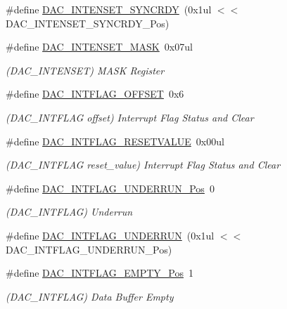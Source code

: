 \begin{DoxyCompactItemize}
\#define \mbox{\hyperlink{group___s_a_m_d21___d_a_c_ga160f399b31890e2fb6af4a43bd547952}{D\+A\+C\+\_\+\+I\+N\+T\+E\+N\+S\+E\+T\+\_\+\+S\+Y\+N\+C\+R\+DY}}~(0x1ul $<$$<$ D\+A\+C\+\_\+\+I\+N\+T\+E\+N\+S\+E\+T\+\_\+\+S\+Y\+N\+C\+R\+D\+Y\+\_\+\+Pos)
\item 
\#define \mbox{\hyperlink{group___s_a_m_d21___d_a_c_ga16937f1a74d06e17331ee7d86534570a}{D\+A\+C\+\_\+\+I\+N\+T\+E\+N\+S\+E\+T\+\_\+\+M\+A\+SK}}~0x07ul
\begin{DoxyCompactList}\small\item\em (D\+A\+C\+\_\+\+I\+N\+T\+E\+N\+S\+ET) M\+A\+SK Register \end{DoxyCompactList}\item 
\#define \mbox{\hyperlink{group___s_a_m_d21___d_a_c_gadb76074cbcb6b6dbbe088030f72d5a4b}{D\+A\+C\+\_\+\+I\+N\+T\+F\+L\+A\+G\+\_\+\+O\+F\+F\+S\+ET}}~0x6
\begin{DoxyCompactList}\small\item\em (D\+A\+C\+\_\+\+I\+N\+T\+F\+L\+AG offset) Interrupt Flag Status and Clear \end{DoxyCompactList}\item 
\#define \mbox{\hyperlink{group___s_a_m_d21___d_a_c_ga9f73e182aae9decbe33d83db01b2830b}{D\+A\+C\+\_\+\+I\+N\+T\+F\+L\+A\+G\+\_\+\+R\+E\+S\+E\+T\+V\+A\+L\+UE}}~0x00ul
\begin{DoxyCompactList}\small\item\em (D\+A\+C\+\_\+\+I\+N\+T\+F\+L\+AG reset\+\_\+value) Interrupt Flag Status and Clear \end{DoxyCompactList}\item 
\#define \mbox{\hyperlink{group___s_a_m_d21___d_a_c_ga6c43469c26efeb772af1a2ceba6e472b}{D\+A\+C\+\_\+\+I\+N\+T\+F\+L\+A\+G\+\_\+\+U\+N\+D\+E\+R\+R\+U\+N\+\_\+\+Pos}}~0
\begin{DoxyCompactList}\small\item\em (D\+A\+C\+\_\+\+I\+N\+T\+F\+L\+AG) Underrun \end{DoxyCompactList}\item 
\#define \mbox{\hyperlink{group___s_a_m_d21___d_a_c_ga425d2358996c173b122575d98cb04434}{D\+A\+C\+\_\+\+I\+N\+T\+F\+L\+A\+G\+\_\+\+U\+N\+D\+E\+R\+R\+UN}}~(0x1ul $<$$<$ D\+A\+C\+\_\+\+I\+N\+T\+F\+L\+A\+G\+\_\+\+U\+N\+D\+E\+R\+R\+U\+N\+\_\+\+Pos)
\item 
\#define \mbox{\hyperlink{group___s_a_m_d21___d_a_c_ga0dac29b106d18582f439752a01102763}{D\+A\+C\+\_\+\+I\+N\+T\+F\+L\+A\+G\+\_\+\+E\+M\+P\+T\+Y\+\_\+\+Pos}}~1
\begin{DoxyCompactList}\small\item\em (D\+A\+C\+\_\+\+I\+N\+T\+F\+L\+AG) Data Buffer Empty \end{DoxyCompactList}\item 

\end{DoxyCompactItemize}
